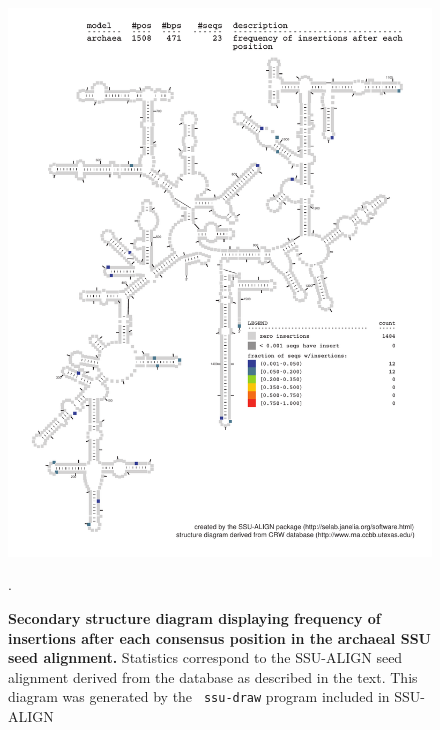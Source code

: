 \begin{figure}
\begin{center}
\includegraphics[width=5.64in]{Figures/archaea-0p1-ifreq}
\end{center}
\caption[Secondary structure diagram displaying frequency of insertions
  after each consensus position in the archaeal SSU seed
  alignment]{\textbf{Secondary structure diagram displaying frequency
  of insertions after each consensus position in the archaeal SSU seed
  alignment.} Statistics correspond to the SSU-ALIGN seed
  alignment derived from the  database \cite{CannoneGutell02}
  as described in the text. This diagram was generated by the {\tt
  ssu-draw} program included in SSU-ALIGN}.
\label{fig:arcifreq}
\end{figure}

\newpage 

